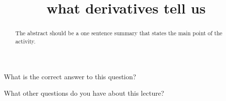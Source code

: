 \documentclass{ximera}
\title{what derivatives tell us}
\begin{document}
\begin{abstract}
  The abstract should be a one sentence summary that states the main point of the activity.
\end{abstract}

\maketitle

\begin{question}
  What is the correct answer to this question?

  
    \begin{multipleChoice}
    \end{multipleChoice}  
  
\end{question}

What other questions do you have about this lecture?
\begin{question}
  \begin{freeResponse}
  \end{freeRepsonse}
\end{question}
\end{document}
